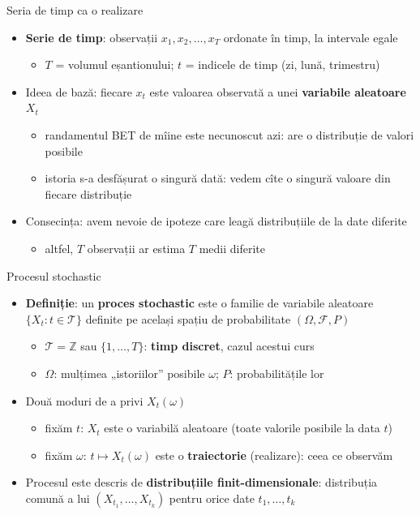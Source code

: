 \begin{frame}{Seria de timp ca o realizare}
\itemsize{\small}
\begin{itemize}
    \item \textbf{Serie de timp}: observații $x_1, x_2, \dots, x_T$ ordonate în timp, la intervale egale
    \begin{itemize}
        \item $T$ = volumul eșantionului; $t$ = indicele de timp (zi, lună, trimestru)
    \end{itemize}
    \item Ideea de bază: fiecare $x_t$ este valoarea observată a unei \textbf{variabile aleatoare} $X_t$
    \begin{itemize}
        \item randamentul BET de mîine este necunoscut azi: are o distribuție de valori posibile
        \item istoria s-a desfășurat o singură dată: vedem cîte o singură valoare din fiecare distribuție
    \end{itemize}
    \item Consecința: avem nevoie de ipoteze care leagă distribuțiile de la date diferite
    \begin{itemize}
        \item altfel, $T$ observații ar estima $T$ medii diferite
    \end{itemize}
\end{itemize}
\end{frame}

\begin{frame}{Procesul stochastic}
\itemsize{\small}
\begin{itemize}
    \item \textbf{Definiție}: un \textbf{proces stochastic} este o familie de variabile aleatoare $\{X_t : t \in \mathcal{T}\}$ definite pe același spațiu de probabilitate $(\Omega, \mathcal{F}, P)$
    \begin{itemize}
        \item $\mathcal{T} = \mathbb{Z}$ sau $\{1, \dots, T\}$: \textbf{timp discret}, cazul acestui curs
        \item $\Omega$: mulțimea „istoriilor” posibile $\omega$; $P$: probabilitățile lor
    \end{itemize}
    \item Două moduri de a privi $X_t(\omega)$
    \begin{itemize}
        \item fixăm $t$: $X_t$ este o variabilă aleatoare (toate valorile posibile la data $t$)
        \item fixăm $\omega$: $t \mapsto X_t(\omega)$ este o \textbf{traiectorie} (realizare): ceea ce observăm
    \end{itemize}
    \item Procesul este descris de \textbf{distribuțiile finit-dimensionale}: distribuția comună a lui $(X_{t_1}, \dots, X_{t_k})$ pentru orice date $t_1, \dots, t_k$
\end{itemize}
\end{frame}

